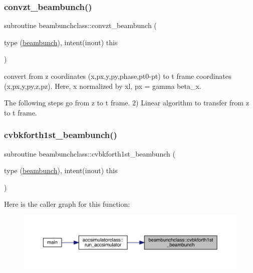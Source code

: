 \subsubsection{\texorpdfstring{convzt\_beambunch()}{convzt\_beambunch()}}
{\footnotesize\ttfamily subroutine beambunchclass\+::convzt\+\_\+beambunch (\begin{DoxyParamCaption}\item[{type (\mbox{\hyperlink{namespacebeambunchclass_structbeambunchclass_1_1beambunch}{beambunch}}), intent(inout)}]{this }\end{DoxyParamCaption})}



convert from z coordinates (x,px,y,py,phase,pt0-\/pt) to t frame coordinates (x,px,y,py,z,pz). Here, x normalized by xl, px = gamma beta\+\_\+x. 

The following steps go from z to t frame. 2) Linear algorithm to transfer from z to t frame. \mbox{\label{namespacebeambunchclass_acacb775484bda2729c3da9adbbeffc53}} 
\subsubsection{\texorpdfstring{cvbkforth1st\_beambunch()}{cvbkforth1st\_beambunch()}}
{\footnotesize\ttfamily subroutine beambunchclass\+::cvbkforth1st\+\_\+beambunch (\begin{DoxyParamCaption}\item[{type (\mbox{\hyperlink{namespacebeambunchclass_structbeambunchclass_1_1beambunch}{beambunch}}), intent(inout)}]{this }\end{DoxyParamCaption})}

Here is the caller graph for this function\+:\nopagebreak
\begin{figure}[H]
\begin{center}
\leavevmode
\includegraphics[width=350pt]{namespacebeambunchclass_acacb775484bda2729c3da9adbbeffc53_icgraph}
\end{center}
\end{figure}
\mbox{\label{namespacebeambunchclass_aa0438cba132ce3b2fdc8e053375c0097}} 
